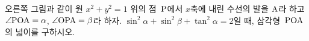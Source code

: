 \noindent\begin{minipage}[t]{0.58\linewidth}\vspace{0pt}\raggedright 오른쪽 그림과 같이 원 $x^{2}+y^{2}=1$ 위의 점~$\mathrm{P}$에서 $x$축에 내린 수선의 발을 $\mathrm{A}$라 하고 $\angle\mathrm{POA}=\alpha$, $\angle\mathrm{OPA}=\beta$라 하자. $\sin^{2}\alpha+\sin^{2}\beta+\tan^{2}\alpha=2$일 때, 삼각형~$\mathrm{POA}$의 넓이를 구하시오.\end{minipage}\hfill\begin{minipage}[t]{0.4\linewidth}\vspace{0pt}\centering \resizebox{\ifdim\width>\linewidth\linewidth\else\width\fi}{!}{}\end{minipage}\par
